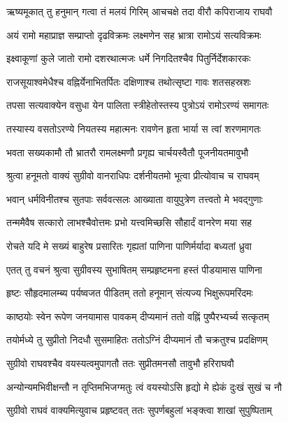 
\twolineshloka
{ऋष्यमूकात् तु हनुमान् गत्वा तं मलयं गिरिम्}
{आचचक्षे तदा वीरौ कपिराजाय राघवौ} %

\twolineshloka
{अयं रामो महाप्राज्ञ सम्प्राप्तो दृढविक्रमः}
{लक्ष्मणेन सह भ्रात्रा रामोऽयं सत्यविक्रमः} %

\twolineshloka
{इक्ष्वाकूणां कुले जातो रामो दशरथात्मजः}
{धर्मे निगदितश्चैव पितुर्निर्देशकारकः} %

\twolineshloka
{राजसूयाश्वमेधैश्च वह्निर्येनाभितर्पितः}
{दक्षिणाश्च तथोत्सृष्टा गावः शतसहस्रशः} %

\twolineshloka
{तपसा सत्यवाक्येन वसुधा येन पालिता}
{स्त्रीहेतोस्तस्य पुत्रोऽयं रामोऽरण्यं समागतः} %

\twolineshloka
{तस्यास्य वसतोऽरण्ये नियतस्य महात्मनः}
{रावणेन हृता भार्या स त्वां शरणमागतः} %

\twolineshloka
{भवता सख्यकामौ तौ भ्रातरौ रामलक्ष्मणौ}
{प्रगृह्य चार्चयस्वैतौ पूजनीयतमावुभौ} %

\twolineshloka
{श्रुत्वा हनूमतो वाक्यं सुग्रीवो वानराधिपः}
{दर्शनीयतमो भूत्वा प्रीत्योवाच च राघवम्} %

\twolineshloka
{भवान् धर्मविनीतश्च सुतपाः सर्ववत्सलः}
{आख्याता वायुपुत्रेण तत्त्वतो मे भवद्गुणाः} %

\twolineshloka
{तन्ममैवैष सत्कारो लाभश्चैवोत्तमः प्रभो}
{यत्त्वमिच्छसि सौहार्दं वानरेण मया सह} %

\twolineshloka
{रोचते यदि मे सख्यं बाहुरेष प्रसारितः}
{गृह्यतां पाणिना पाणिर्मर्यादा बध्यतां ध्रुवा} %

\twolineshloka
{एतत् तु वचनं श्रुत्वा सुग्रीवस्य सुभाषितम्}
{सम्प्रहृष्टमना हस्तं पीडयामास पाणिना} %

\twolineshloka
{हृष्टः सौहृदमालम्ब्य पर्यष्वजत पीडितम्}
{ततो हनूमान् संत्यज्य भिक्षुरूपमरिंदमः} %

\twolineshloka
{काष्ठयोः स्वेन रूपेण जनयामास पावकम्}
{दीप्यमानं ततो वह्निं पुष्पैरभ्यर्च्य सत्कृतम्} %

\twolineshloka
{तयोर्मध्ये तु सुप्रीतो निदधौ सुसमाहितः}
{ततोऽग्निं दीप्यमानं तौ चक्रतुश्च प्रदक्षिणम्} %

\twolineshloka
{सुग्रीवो राघवश्चैव वयस्यत्वमुपागतौ}
{ततः सुप्रीतमनसौ तावुभौ हरिराघवौ} %

\twolineshloka
{अन्योन्यमभिवीक्षन्तौ न तृप्तिमभिजग्मतुः}
{त्वं वयस्योऽसि हृद्यो मे ह्येकं दुःखं सुखं च नौ} %

\twolineshloka
{सुग्रीवो राघवं वाक्यमित्युवाच प्रहृष्टवत्}
{ततः सुपर्णबहुलां भङ्क्त्वा शाखां सुपुष्पिताम्} %

